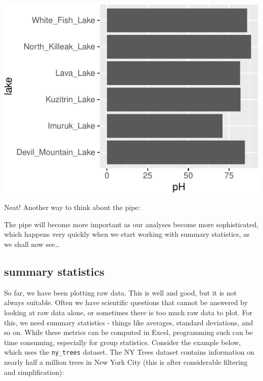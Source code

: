 \documentclass[
]{krantz}
\begin{document}
\begin{center}\includegraphics{index_files/figure-latex/unnamed-chunk-70-1} \end{center}

Neat! Another way to think about the pipe:

The pipe will become more important as our analyses become more sophisticated, which happens very quickly when we start working with summary statistics, as we shall now see\ldots{}

\hypertarget{summary-statistics}{%
\subsection{summary statistics}\label{summary-statistics}}

So far, we have been plotting raw data. This is well and good, but it is not always suitable. Often we have scientific questions that cannot be answered by looking at raw data alone, or sometimes there is too much raw data to plot. For this, we need summary statistics - things like averages, standard deviations, and so on. While these metrics can be computed in Excel, programming such can be time consuming, especially for group statistics. Consider the example below, which uses the \texttt{ny\_trees} dataset. The NY Trees dataset contains information on nearly half a million trees in New York City (this is after considerable filtering and simplification):
\end{document}
